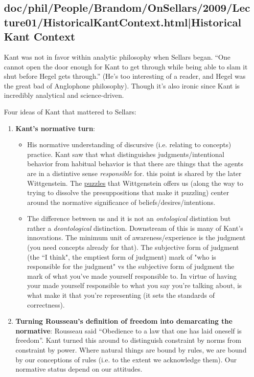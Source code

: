 \documentclass[12pt,a4paper]{report}
\begin{document}
\subsection{doc/phil/People/Brandom/OnSellars/2009/Lecture01/HistoricalKantContext.html|Historical Kant Context}
Kant was not in favor within analytic philosophy when Sellars began. ``One cannot open the door enough for Kant to get through while being able to slam it shut before Hegel gets through.'' (He's too interesting of a reader, and Hegel was the great bad of Anglophone philosophy). Though it's also ironic since Kant is incredibly analytical and science-driven.

Four ideas of Kant that mattered to Sellars:
\begin{enumerate}
\item \textbf{Kant's normative turn}:
\begin{itemize}
\item His normative understanding of discursive (i.e. relating to concepts) practice. Kant saw that what distinguishes judgments/intentional behavior from habitual behavior is that there are things that the agents are in a distintive sense \emph{responsible} for. this point is shared by the later Wittgenstein. The \href{doc/phil/Phil Situations/Childrens Game.html}{puzzles} that Wittgenstein offers us (along the way to trying to dissolve the presuppositions that make it puzzling) center around the normative significance of beliefs/desires/intentions.

\item The difference between us and it is not an \emph{ontological} distintion but rather a \emph{deontological} distinction. Downstream of this is many of Kant's innovations. The minimum unit of awareness/experience is the judgment (you need concepts already for that). The subjective form of judgment (the ``I think", the emptiest form of judgment) mark of "who is responsible for the judgment" vs the subjective form of judgment the mark of what you've made yourself responsible to. In virtue of having your made yourself responsible to what you say you're talking about, is what make it that you're representing (it sets the standards of correctness).
\end{itemize}

\item \textbf{Turning Rousseau's definition of freedom into demarcating the normative}: Rousseau said ``Obedience to a law that one has laid oneself is freedom''. Kant turned this around to distinguish constraint by norms from constraint by power. Where natural things are bound by rules, we are bound by our conceptions of rules (i.e. to the extent we acknowledge them). Our normative status depend on our attitudes.


\end{enumerate}
\end{document}
